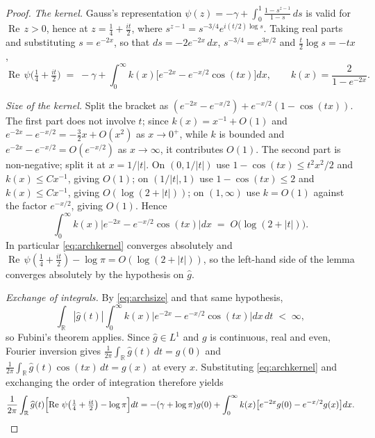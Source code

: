 ﻿\documentclass[11pt]{article}
\newcommand{\R}{\mathbb{R}}
\newcommand{\Rey}{\operatorname{Re}}
\begin{document}
\begin{proof}
\emph{The kernel.}  Gauss's representation
$\psi(z)=-\gamma+\int_0^1\frac{1-s^{z-1}}{1-s}\,ds$ is valid for
$\Rey\,z>0$, hence at $z=\frac14+\frac{it}2$, where
$s^{z-1}=s^{-3/4}e^{i(t/2)\log s}$.  Taking real parts and substituting
$s=e^{-2x}$, so that $ds=-2e^{-2x}\,dx$, $s^{-3/4}=e^{3x/2}$ and
$\frac t2\log s=-tx$,
\begin{equation}\label{eq:archkernel}
  \Rey\,\psi\bigl(\tfrac14+\tfrac{it}2\bigr)
  \;=\;-\gamma+\int_0^\infty k(x)
  \bigl[e^{-2x}-e^{-x/2}\cos(tx)\bigr]dx,
  \qquad k(x)=\frac2{1-e^{-2x}} .
\end{equation}

\emph{Size of the kernel.}  Split the bracket as
$(e^{-2x}-e^{-x/2})+e^{-x/2}(1-\cos(tx))$.  The first part does not
involve $t$; since $k(x)=x^{-1}+O(1)$ and
$e^{-2x}-e^{-x/2}=-\frac32x+O(x^2)$ as $x\to0^+$, while $k$ is bounded
and $e^{-2x}-e^{-x/2}=O(e^{-x/2})$ as $x\to\infty$, it contributes
$O(1)$.  The second part is non-negative; split it at $x=1/|t|$.  On
$(0,1/|t|)$ use $1-\cos(tx)\le t^2x^2/2$ and $k(x)\le Cx^{-1}$, giving
$O(1)$; on $(1/|t|,1)$ use $1-\cos(tx)\le2$ and $k(x)\le Cx^{-1}$,
giving $O(\log(2+|t|))$; on $(1,\infty)$ use $k=O(1)$ against the
factor $e^{-x/2}$, giving $O(1)$.  Hence
\begin{equation}\label{eq:archsize}
  \int_0^\infty k(x)\bigl|e^{-2x}-e^{-x/2}\cos(tx)\bigr|dx
  \;=\;O\bigl(\log(2+|t|)\bigr) .
\end{equation}
In particular \eqref{eq:archkernel} converges absolutely and
$\Rey\,\psi(\frac14+\frac{it}2)-\log\pi=O(\log(2+|t|))$, so the
left-hand side of the lemma converges absolutely by the hypothesis on
$\widehat g$.

\emph{Exchange of integrals.}  By \eqref{eq:archsize} and that same
hypothesis,
\[
  \int_{\R}|\widehat g(t)|\int_0^\infty k(x)
  \bigl|e^{-2x}-e^{-x/2}\cos(tx)\bigr|dx\,dt\;<\;\infty ,
\]
so Fubini's theorem applies.  Since $\widehat g\in L^1$ and $g$ is
continuous, real and even, Fourier inversion gives
$\frac1{2\pi}\int_{\R}\widehat g(t)\,dt=g(0)$ and
$\frac1{2\pi}\int_{\R}\widehat g(t)\cos(tx)\,dt=g(x)$ at every $x$.
Substituting \eqref{eq:archkernel} and exchanging the order of
integration therefore yields
\begin{equation}\label{eq:archhalf}
  \frac1{2\pi}\int_{\R}\widehat g(t)
  \Bigl[\Rey\,\psi\bigl(\tfrac14+\tfrac{it}2\bigr)-\log\pi\Bigr]dt
  =-(\gamma+\log\pi)g(0)
  +\int_0^\infty k(x)\bigl[e^{-2x}g(0)-e^{-x/2}g(x)\bigr]dx .
\end{equation}


\end{proof}
\end{document}
